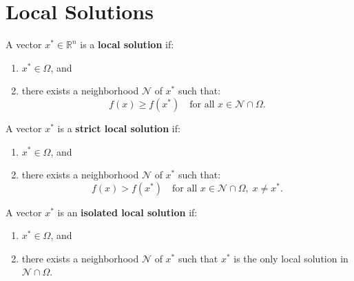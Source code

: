 \section{Local Solutions}

\begin{definition}
A vector $x^* \in \mathbb{R}^n$ is a \textbf{local solution} if:
\begin{enumerate}
    \item $x^* \in \Omega$, and
    \item there exists a neighborhood $\mathcal{N}$ of $x^*$ such that:
    \begin{equation}
        f(x) \geq f(x^*) \quad \text{for all } x \in \mathcal{N} \cap \Omega.
    \end{equation}
\end{enumerate}
\end{definition}

\begin{definition}
A vector $x^*$ is a \textbf{strict local solution} if:
\begin{enumerate}
    \item $x^* \in \Omega$, and
    \item there exists a neighborhood $\mathcal{N}$ of $x^*$ such that:
    \begin{equation}
        f(x) > f(x^*) \quad \text{for all } x \in \mathcal{N} \cap \Omega, \; x \neq x^*.
    \end{equation}
\end{enumerate}
\end{definition}

\begin{definition}
A vector $x^*$ is an \textbf{isolated local solution} if:
\begin{enumerate}
    \item $x^* \in \Omega$, and
    \item there exists a neighborhood $\mathcal{N}$ of $x^*$ such that $x^*$ is the only local solution in $\mathcal{N} \cap \Omega$.
\end{enumerate}
\end{definition}

